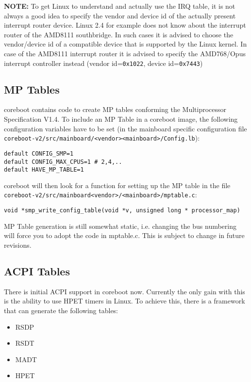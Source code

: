 \documentclass[titlepage,12pt]{article}
\begin{document}
\textbf{NOTE:} To get Linux to understand and actually use the IRQ
table, it is not always a good idea to specify the vendor and device id
of the actually present interrupt router device. Linux 2.4 for example
does not know about the interrupt router of the AMD8111 southbridge. In
such cases it is advised to choose the vendor/device id of a compatible
device that is supported by the Linux kernel. In case of the AMD8111
interrupt router it is advised to specify the AMD768/Opus interrupt
controller instead (vendor id=\texttt{0x1022}, device id=\texttt{0x7443})

\subsection {MP Tables}

coreboot contains code to create MP tables conforming the
Multiprocessor Specification V1.4. To include an MP Table in a coreboot
image, the following configuration variables have to be set (in the
mainboard specific configuration file
\texttt{coreboot-v2/src/mainboard/<vendor><mainboard>/Config.lb}):

\begin{verbatim}
default CONFIG_SMP=1
default CONFIG_MAX_CPUS=1 # 2,4,..
default HAVE_MP_TABLE=1
\end{verbatim}

coreboot will then look for a function for setting up the MP table in
the file \texttt{coreboot-v2/src/mainboard<vendor>/<mainboard>/mptable.c}:

\begin{verbatim}
void *smp_write_config_table(void *v, unsigned long * processor_map)
\end{verbatim}

MP Table generation is still somewhat static, i.e. changing the bus
numbering will force
you to adopt the code in mptable.c. This is subject to change in future
revisions.

\subsection {ACPI Tables}

There is initial ACPI support in coreboot now. Currently the only gain with
this is the ability to use HPET timers in Linux. To achieve this, there is a
framework that can generate the following tables: 
\begin{itemize}
\item RSDP
\item RSDT
\item MADT
\item HPET
\end{itemize}
\end{document}
